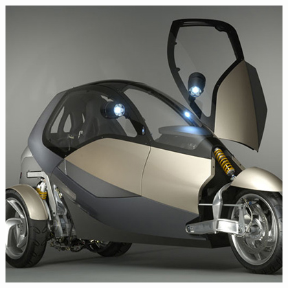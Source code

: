 \begin{figure}[h]
		\endminipage\hfill
		  \includegraphics[width=1.0\linewidth]{figs/02/clever}
		\endminipage
		\\[0pt]
\end{figure}
		  
